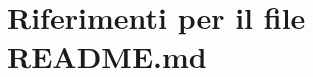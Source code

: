 \hypertarget{README_8md}{}\section{Riferimenti per il file R\+E\+A\+D\+M\+E.\+md}
\label{README_8md}
